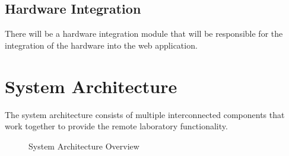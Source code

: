 \documentclass[a4paper,twoside,11pt]{article}
\begin{document}
\subsection*{Hardware Integration}
There will be a hardware integration module that will be responsible for the integration of the hardware into the web application.

\section*{System Architecture}
The system architecture consists of multiple interconnected components that work together to provide the remote laboratory functionality.
\begin{figure}[h]
	\begin{center}
	\end{center}
	\caption{System Architecture Overview}\label{fig:system-architecture}
\end{figure}
\end{document}
